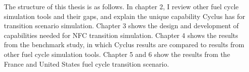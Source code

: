 The structure of this thesis is as follows. In chapter 2, I review other fuel cycle simulation
tools and their gaps, and explain the unique capability Cyclus
has for transition scenario simulation.
Chapter 3 shows the design and
development of capabilities needed for \gls{NFC} transition simulation.
Chapter 4 shows the results from the benchmark study, in which Cyclus results are compared
to results from other fuel cycle simulation tools.
Chapter 5 and 6 show the results from the France and United States fuel cycle
transition scenario.

